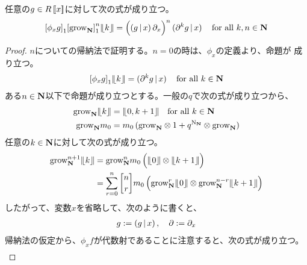 {	\begin{proposition}[通常の微分と二分木]\label{prop:通常の微分と二分木} %
		任意の$g\in R\mathinner{[\![{x}]\!]}$に対して次の式が成り立つ。
		\begin{equation*}\begin{split}
			{\mathinner{[{\phi_xg}]}}_1{\mathinner{[{{\mathinner{\operatorname{grow}}}_{\ensuremath{\mathbf{N}}}}]}}_1^n{|\!\lfloor{k}\rfloor\!|}
			= \mathinner{\Bigl({\mathinner{({g{\,|\,}x})}\partial_x}\Bigr)}^n\mathinner{({\partial^kg{\,|\,}x})}
			\quad\text{for all } k,n\in\mathbf{N}
		\end{split}\end{equation*}
	\end{proposition} %
	\begin{proof} %
		$n$についての帰納法で証明する。$n=0$の時は、$\phi_x$の定義より、命題が
		成り立つ。
		\begin{equation*}\begin{split}
			{\mathinner{[{\phi_xg}]}}_1{|\!\lfloor{k}\rfloor\!|} = \mathinner{({\partial^kg{\,|\,}x})} 
			\quad\text{for all } k\in\mathbf{N}
		\end{split}\end{equation*}
		ある$n\in\mathbf{N}$以下で命題が成り立つとする。一般の$q$で次の式が成り立つから、
		\begin{equation*}\begin{split}
			{\mathinner{\operatorname{grow}}}_{\mathbf{N}}{|\!\lfloor{k}\rfloor\!|} &= {|\!\lfloor{0,k+1}\rfloor\!|}
			\quad\text{for all } k\in\mathbf{N} \\
			{\mathinner{\operatorname{grow}}}_{\mathbf{N}} m_0 &= m_0\mathinner{({{\mathinner{\operatorname{grow}}}_{\ensuremath{\mathbf{N}}}\otimes1
				+ q^{{\mathinner{\operatorname{N}}}_{\ensuremath{\mathbf{N}}}}\otimes{\mathinner{\operatorname{grow}}}_{\ensuremath{\mathbf{N}}}})} \\
		\end{split}\end{equation*}
		任意の$k\in\mathbf{N}$に対して次の式が成り立つ。
		\begin{equation*}\begin{split}
			\grow_\sizen^{n+1}\word{k}
			&= \grow_\sizen^nm_0\plrgg{\word{0}\otimes\word{k+1}} \\
			&= \sum_{r=0}^n\qbinom{n}{r}m_0\plrgg{
				\grow_\sizen^r\word{0}\otimes\grow_\sizen^{n-r}\word{k+1}} \\
		\end{split}\end{equation*}
		したがって、変数$x$を省略して、次のように書くと、
		\begin{equation*}\begin{split}
			g := \mathinner{({g{\,|\,}x})},\quad \partial := \partial_x
		\end{split}\end{equation*}
		帰納法の仮定から、$\phi_xf$が代数射であることに注意すると、次の式が成り立つ。
		\begin{equation*}\begin{split}

\end{split}
\end{equation*}
\end{proof}}
